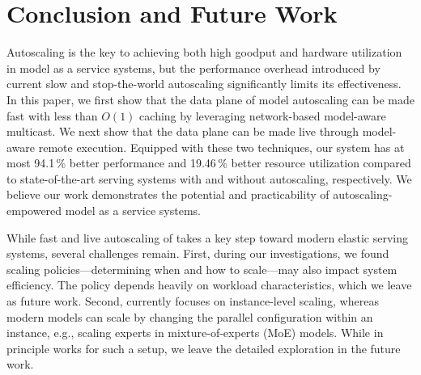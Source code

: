 \section{Conclusion and Future Work}
\label{sec:concl}

\noindent
Autoscaling is the key to achieving both high goodput and hardware utilization
in model as a service systems,
but the performance overhead introduced by current slow and stop-the-world autoscaling
significantly limits its effectiveness.
In this paper, we first show that the data plane of model autoscaling
can be made fast with less than $O(1)$ caching by leveraging
network-based model-aware multicast.
We next show that the data plane can be made live through model-aware remote execution.
Equipped with these two techniques,
our system {\sys} has at most 94.1\,\% better performance
and 19.46\,\% better resource utilization compared to state-of-the-art serving systems
with and without autoscaling, respectively.
We believe our work
demonstrates the potential and practicability of autoscaling-empowered model
as a service systems.

While fast and live autoscaling of {\sys} takes a key step toward
modern elastic serving systems,
several challenges remain.
First,
during our investigations, we found
scaling policies---determining when and how to scale---may also impact system efficiency.
The policy depends heavily on workload characteristics,
which we leave as future work.
Second, {\sys} currently focuses on instance-level scaling,
whereas modern models can scale by changing the parallel configuration within an instance,
e.g., scaling experts in mixture-of-experts (MoE) models.
While {\sys} in principle works for such a setup,
we leave the detailed exploration in the future work.


